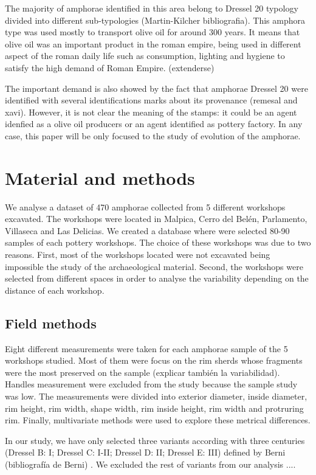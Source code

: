 \documentclass[review]{elsarticle}
\begin{document}
The majority of amphorae identified in this area belong to Dressel 20 typology divided into different sub-typologies (Martin-Kilcher bibliografia). This amphora type was used mostly to transport olive oil for around 300 years. It means that olive oil was an important product in the roman empire, being used in different aspect of the roman daily life such as consumption, lighting and hygiene to satisfy the high demand of Roman Empire. (extenderse) 

The important demand is also showed by the fact that amphorae Dressel 20 were identified with several identifications marks about its provenance (remesal and xavi). However, it is not clear the meaning of the stamps: it could be an agent idenfied as a olive oil producers or an agent identified as pottery factory. In any case, this paper will be only focused to the study of evolution of the amphorae. 


\section{Material and methods}

We analyse a dataset of 470 amphorae collected from 5 different workshops excavated. 
The workshops were located in Malpica, Cerro del Belén, Parlamento, Villaseca and Las Delicias. We created a database where were selected 80-90 samples of each pottery workshops. The choice of these workshops was due to two reasons. First, most of the workshops located were not excavated being impossible the study of the archaeological material. Second, the workshops were selected from different spaces in order to analyse the variability depending on the distance of each workshop. 

\subsection{Field methods}


Eight different measurements were taken for each amphorae sample of the 5 workshops studied. Most of them were focus on the rim sherds whose fragments were the most preserved on the sample (explicar también la variabilidad). Handles measurement were excluded from the study because the sample study was low. The measurements were divided into exterior diameter, inside diameter, rim height, rim width, shape width, rim inside height, rim width and protruring rim. Finally, multivariate methods were used to explore these metrical differences. 

In our study, we have only selected three variants according with three centuries (Dressel B: I; Dressel C: I-II; Dressel D: II; Dressel E: III) defined by Berni (bibliografía de Berni) . We excluded the rest of variants from our analysis ....
\end{document}
